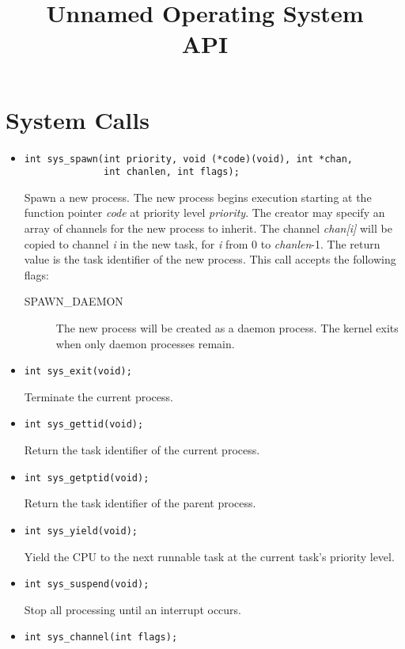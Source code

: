 \documentclass[letterpaper]{article}
\title{Unnamed Operating System\\API}
\begin{document}
\maketitle
\section{System Calls}
\begin{itemize}
\item \begin{verbatim}
int sys_spawn(int priority, void (*code)(void), int *chan,
              int chanlen, int flags);\end{verbatim}

Spawn a new process. The new process begins execution starting at the function pointer \emph{code} at priority level
\emph{priority}. The creator may specify an array of channels for the new process to inherit. The channel
\emph{chan[i]} will be copied to channel \emph{i} in the new task, for \emph{i} from 0 to \emph{chanlen}-1. The
return value is the task identifier of the new process.
This call accepts the following flags:
\begin{description}
\item[SPAWN\_DAEMON] The new process will be created as a daemon process. The kernel exits when only
		     daemon processes remain.
\end{description}
\item \begin{verbatim}int sys_exit(void);\end{verbatim}
Terminate the current process.
\item \begin{verbatim}int sys_gettid(void);\end{verbatim}
Return the task identifier of the current process.
\item \begin{verbatim}int sys_getptid(void);\end{verbatim}
Return the task identifier of the parent process.
\item \begin{verbatim}int sys_yield(void);\end{verbatim}
Yield the CPU to the next runnable task at the current task's priority level.
\item \begin{verbatim}int sys_suspend(void);\end{verbatim}
Stop all processing until an interrupt occurs.
\item \begin{verbatim}int sys_channel(int flags);\end{verbatim}

\end{itemize}
\end{document}
